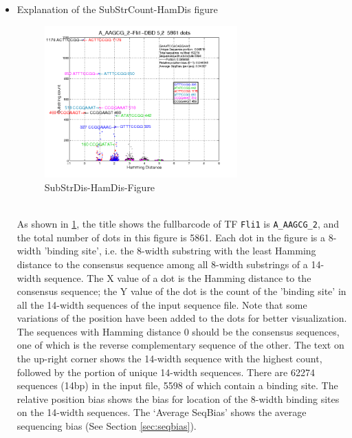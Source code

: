 \documentclass[a4paper,10pt]{article}
\begin{document}
\begin{itemize}
 \item Explanation of the SubStrCount-HamDis figure
   \begin{figure}[htp]
    \centering
    \includegraphics[width=0.7\textwidth]{A_AAGCG_2.png}
    \caption{SubStrDis-HamDis-Figure}
    \label{fig:subhamfig}
   \end{figure} \\
  As shown in \figurename{} \ref{fig:subhamfig}, the title shows the fullbarcode of TF \texttt{Fli1} is \texttt{A\_AAGCG\_2},
  and the total number of dots in this figure is 5861. Each dot in the figure is a 8-width 'binding site', 
  i.e. the 8-width substring with the least Hamming distance to the consensus sequence among all 8-width substrings of a 14-width sequence. 
  The X value of a dot is the Hamming distance to the consensus sequence; the Y value of the dot is the count of the 'binding site' in all the
  14-width sequences of the input sequence file. Note that some variations of the position have been added to the dots for better visualization.
  The sequences with Hamming distance 0 should be the consensus sequences, one of which is the reverse complementary sequence of the other.
  The text on the up-right corner shows the 14-width sequence with the highest count, followed by the portion of unique 14-width sequences. 
  There are 62274 sequences (14bp) in the input file, 5598 of which contain a binding site. 
  The relative position bias shows the bias for location of the 8-width binding sites on the 14-width sequences.
  The `Average SeqBias' shows the average sequencing bias (See Section \ref{sec:seqbias}).
\end{itemize}
\end{document}
